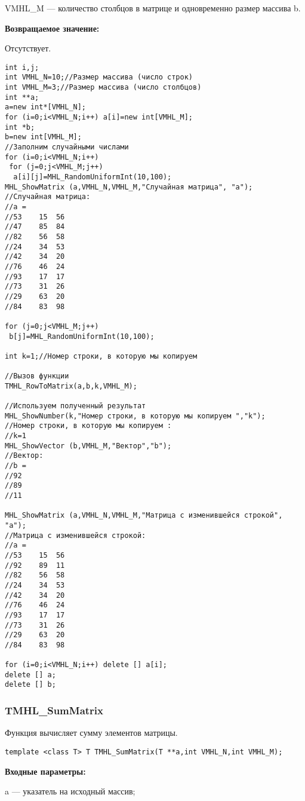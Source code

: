 \documentclass[a4paper,12pt]{article}
\begin{document}
VMHL\_M --- количество столбцов в матрице и одновременно размер массива b.

\textbf{Возвращаемое значение:}

Отсутствует.


\begin{lstlisting}[label=code_use_TMHL_RowToMatrix,caption=Пример использования]
int i,j;
int VMHL_N=10;//Размер массива (число строк)
int VMHL_M=3;//Размер массива (число столбцов)
int **a;
a=new int*[VMHL_N];
for (i=0;i<VMHL_N;i++) a[i]=new int[VMHL_M];
int *b;
b=new int[VMHL_M];
//Заполним случайными числами
for (i=0;i<VMHL_N;i++)
 for (j=0;j<VMHL_M;j++)
  a[i][j]=MHL_RandomUniformInt(10,100);
MHL_ShowMatrix (a,VMHL_N,VMHL_M,"Случайная матрица", "a");
//Случайная матрица:
//a =	
//53	15	56
//47	85	84
//82	56	58
//24	34	53
//42	34	20
//76	46	24
//93	17	17
//73	31	26
//29	63	20
//84	83	98

for (j=0;j<VMHL_M;j++)
 b[j]=MHL_RandomUniformInt(10,100);

int k=1;//Номер строки, в которую мы копируем

//Вызов функции
TMHL_RowToMatrix(a,b,k,VMHL_M);

//Используем полученный результат
MHL_ShowNumber(k,"Номер строки, в которую мы копируем ","k");
//Номер строки, в которую мы копируем :
//k=1
MHL_ShowVector (b,VMHL_M,"Вектор","b");
//Вектор:
//b =	
//92
//89
//11

MHL_ShowMatrix (a,VMHL_N,VMHL_M,"Матрица с изменившейся строкой", "a");
//Матрица с изменившейся строкой:
//a =	
//53	15	56
//92	89	11
//82	56	58
//24	34	53
//42	34	20
//76	46	24
//93	17	17
//73	31	26
//29	63	20
//84	83	98

for (i=0;i<VMHL_N;i++) delete [] a[i];
delete [] a;
delete [] b;
\end{lstlisting}

\subsubsection{TMHL\_SumMatrix}\label{TMHL_SumMatrix}

Функция вычисляет сумму элементов матрицы.


\begin{lstlisting}[label=code_syntax_TMHL_SumMatrix,caption=Синтаксис]
template <class T> T TMHL_SumMatrix(T **a,int VMHL_N,int VMHL_M);
\end{lstlisting}

\textbf{Входные параметры:}

 a --- указатель на исходный массив;
 
\end{document}
